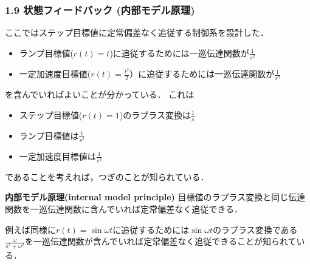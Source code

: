 \begin{frame}[t]
\frametitle{1.9 状態フィードバック (内部モデル原理)}
ここではステップ目標値に定常偏差なく追従する制御系を設計した．\\
\begin{itemize}
  \item ランプ目標値($r(t)=t$)に追従するためには一巡伝達関数が$\frac{1}{s^2}$\\
  \item 一定加速度目標値($r(t)=\frac{t^2}{2}$）に追従するためには一巡伝達関数が$\frac{1}{s^3}$
\end{itemize}
を含んでいればよいことが分かっている．
これは\\
\begin{itemize}
  \item ステップ目標値($r(t)=1$)のラプラス変換は$\frac{1}{s}$
  \item ランプ目標値は$\frac{1}{s^2}$
  \item 一定加速度目標値は$\frac{1}{s^3}$
\end{itemize}
であることを考えれば，つぎのことが知られている．
\begin{block}{\bf 内部モデル原理(internal model principle)}
目標値のラプラス変換と同じ伝達関数を一巡伝達関数に含んでいれば定常偏差なく追従できる．
\end{block}
例えば同様に$r(t)= \sin \omega t$に追従するためには$\sin \omega t$のラプラス変換である$\frac{\omega}{s^2 + \omega^2}$を一巡伝達関数が含んでいれば定常偏差なく追従できることが知られている．
\end{frame}


